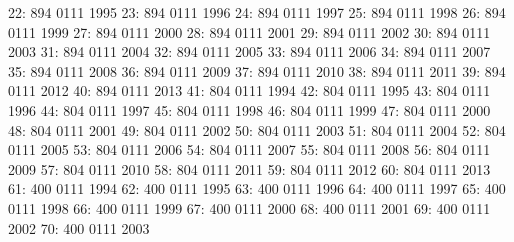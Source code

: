 \documentclass[nojss]{jss}
\begin{document}
\begin{Schunk}
\begin{Soutput}
 22:               894            0111           1995
 23:               894            0111           1996
 24:               894            0111           1997
 25:               894            0111           1998
 26:               894            0111           1999
 27:               894            0111           2000
 28:               894            0111           2001
 29:               894            0111           2002
 30:               894            0111           2003
 31:               894            0111           2004
 32:               894            0111           2005
 33:               894            0111           2006
 34:               894            0111           2007
 35:               894            0111           2008
 36:               894            0111           2009
 37:               894            0111           2010
 38:               894            0111           2011
 39:               894            0111           2012
 40:               894            0111           2013
 41:               804            0111           1994
 42:               804            0111           1995
 43:               804            0111           1996
 44:               804            0111           1997
 45:               804            0111           1998
 46:               804            0111           1999
 47:               804            0111           2000
 48:               804            0111           2001
 49:               804            0111           2002
 50:               804            0111           2003
 51:               804            0111           2004
 52:               804            0111           2005
 53:               804            0111           2006
 54:               804            0111           2007
 55:               804            0111           2008
 56:               804            0111           2009
 57:               804            0111           2010
 58:               804            0111           2011
 59:               804            0111           2012
 60:               804            0111           2013
 61:               400            0111           1994
 62:               400            0111           1995
 63:               400            0111           1996
 64:               400            0111           1997
 65:               400            0111           1998
 66:               400            0111           1999
 67:               400            0111           2000
 68:               400            0111           2001
 69:               400            0111           2002
 70:               400            0111           2003

\end{Soutput}
\end{Schunk}
\end{document}
